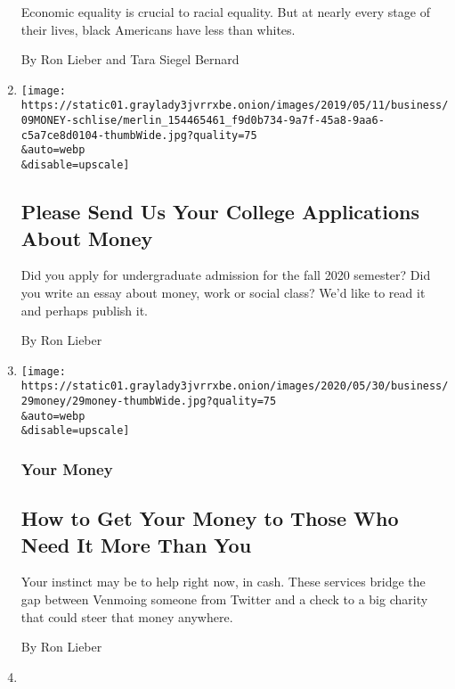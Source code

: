 \begin{enumerate}
  Economic equality is crucial to racial equality. But at nearly every
  stage of their lives, black Americans have less than whites.

  By Ron Lieber and Tara Siegel Bernard
\item
  \href{/2020/06/04/your-money/college-application-essays.html}{}

  \texttt{[image: https://static01.graylady3jvrrxbe.onion/images/2019/05/11/business/09MONEY-schlise/merlin\_154465461\_f9d0b734-9a7f-45a8-9aa6-c5a7ce8d0104-thumbWide.jpg?quality=75\\\&auto=webp\\\&disable=upscale]}

  \hypertarget{please-send-us-your-college-applications-about-money}{%
  \subsection{Please Send Us Your College Applications About
  Money}\label{please-send-us-your-college-applications-about-money}}

  Did you apply for undergraduate admission for the fall 2020 semester?
  Did you write an essay about money, work or social class? We'd like to
  read it and perhaps publish it.

  By Ron Lieber
\item
  \href{/2020/05/30/your-money/philanthropy-charity-giving-coronavirus.html}{}

  \texttt{[image: https://static01.graylady3jvrrxbe.onion/images/2020/05/30/business/29money/29money-thumbWide.jpg?quality=75\\\&auto=webp\\\&disable=upscale]}

  \hypertarget{your-money-3}{%
  \subsubsection{Your Money}\label{your-money-3}}

  \hypertarget{how-to-get-your-money-to-those-who-need-it-more-than-you}{%
  \subsection{How to Get Your Money to Those Who Need It More Than
  You}\label{how-to-get-your-money-to-those-who-need-it-more-than-you}}

  Your instinct may be to help right now, in cash. These services bridge
  the gap between Venmoing someone from Twitter and a check to a big
  charity that could steer that money anywhere.

  By Ron Lieber
\item
  \href{/2020/05/16/business/coronavirus-financial-help.html}{}


\end{enumerate}
